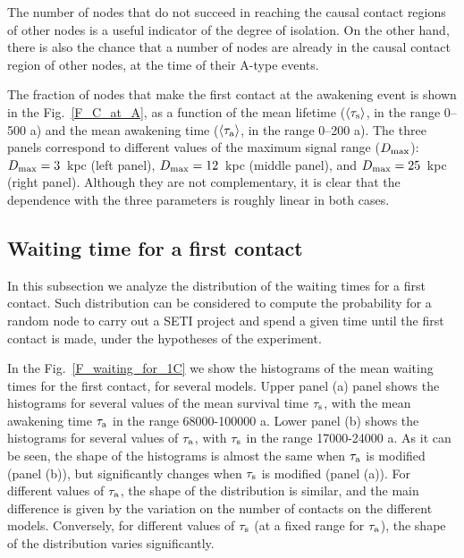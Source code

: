 \documentclass[crop]{CSLB}
\newcommand{\ceti}{node}
\newcommand{\cetis}{nodes}
\newcommand{\ffn}[1]{}
\begin{document}
The number of \cetis{} that do not succeed in reaching the
causal contact regions of other nodes is a useful indicator of
the
degree of isolation.
%
On the other hand, there is also the chance that a number of
\cetis{} are already in the causal contact region of other nodes,
at the time of their A-type events.
%
\ffn{5}
%
The fraction of \cetis{} that make the first contact at the awakening
event is shown in the Fig.~\ref{F_C_at_A}, 
as a function of the mean lifetime
($\left<\tau_{\rm s}\right>$, in the range 0--500 a) and the mean awakening
time ($\left<\tau_{\rm a}\right>$, in the range 0--200 a).
%
The three panels correspond to different values of the maximum signal
range ($D_{\rm max}$):
%
$D_{\rm max}=3$~kpc (left
panel), $D_{\rm max}=12$~kpc (middle panel), and $D_{\rm max}=25$~kpc
(right panel).
%
Although they are not complementary, it is clear that the dependence
with the three parameters is roughly linear in both cases.



\subsection{Waiting time for a first contact}\label{SS_waiting}

In this subsection we analyze the distribution of the waiting times for
a first contact.
%
Such distribution can be considered to compute the probability for a
random \ceti{} to carry out a SETI project and spend a given time until
the first contact is made, under the hypotheses of the experiment.
%
\ffn{6}
%
In the Fig.~\ref{F_waiting_for_1C} we show the histograms of the mean
waiting times for the first contact, for several models.
%
Upper panel (a) panel shows the histograms for several values of the
mean survival time $\tau_{\rm s}$, with the mean awakening time $\tau_{\rm
a}$ in
the range 68000-100000 a.
%
Lower panel (b) shows the histograms for several values of $\tau_{\rm
a}$,
with $\tau_{\rm s}$ in the range 17000-24000 a.
%
As it can be seen, the shape of the histograms is almost the same when
$\tau_{\rm a}$ is modified (panel (b)), but significantly changes when
$\tau_{\rm s}$ is modified (panel (a)). 
%
For different values of $\tau_{\rm a}$, the shape of the distribution is
similar, and the main difference is given by the variation on the number of
contacts on the different models.
%
Conversely, for different values of $\tau_{\rm s}$ (at a fixed range for
$\tau_{\rm a}$), the shape of the
distribution varies significantly.

 
\end{document}
